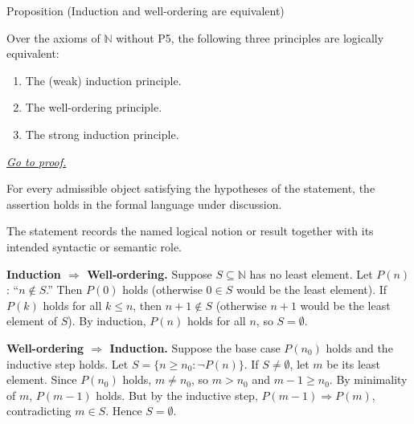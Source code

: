 \begin{propositionbox}{Proposition (Induction and well-ordering are equivalent)}
\begin{proposition}
\label{prop:induction-well-ordering-equivalent}
Over the axioms of $\mathbb{N}$ without P5, the following three
principles are logically equivalent:
\begin{enumerate}[itemsep=2pt]
  \item The (weak) induction principle.
  \item The well-ordering principle.
  \item The strong induction principle.
\end{enumerate}
\hyperref[prf:induction-well-ordering-equivalent]{\textit{Go to proof.}}
\end{proposition}
\end{propositionbox}
\begin{remark*}
For every admissible object satisfying the hypotheses of the statement, the
assertion holds in the formal language under discussion.
\end{remark*}

\begin{remark*}[Interpretation]
The statement records the named logical notion or result together with its
intended syntactic or semantic role.
\end{remark*}


\NoLocalDependencies

\begin{remark}
\textbf{Induction $\Rightarrow$ Well-ordering.}
Suppose $S \subseteq \mathbb{N}$ has no least element.
Let $P(n)$: ``$n \notin S$.''
Then $P(0)$ holds (otherwise $0 \in S$ would be the least element).
If $P(k)$ holds for all $k \leq n$, then $n+1 \notin S$ (otherwise
$n+1$ would be the least element of $S$). By induction, $P(n)$ holds
for all $n$, so $S = \emptyset$.

\medskip
\noindent\textbf{Well-ordering $\Rightarrow$ Induction.}
Suppose the base case $P(n_0)$ holds and the inductive step holds.
Let $S = \{n \geq n_0 : \neg P(n)\}$. If $S \neq \emptyset$, let $m$ be
its least element. Since $P(n_0)$ holds, $m \neq n_0$, so $m > n_0$
and $m - 1 \geq n_0$. By minimality of $m$, $P(m-1)$ holds.
But by the inductive step, $P(m-1) \Rightarrow P(m)$, contradicting
$m \in S$. Hence $S = \emptyset$.
\end{remark}

